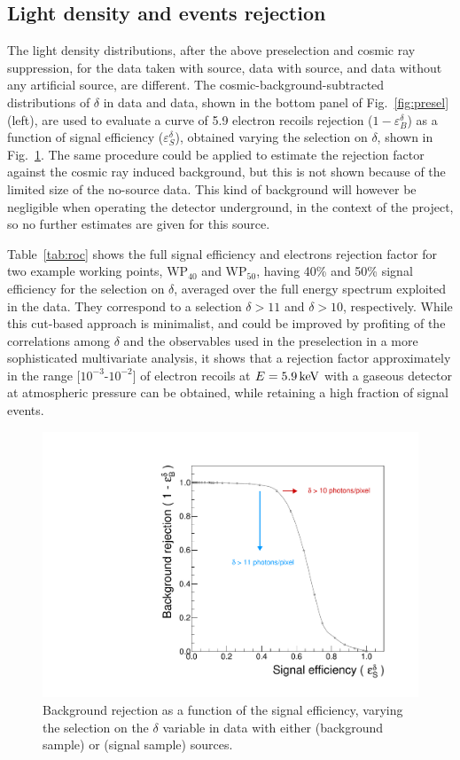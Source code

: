 \subsection{Light density and  \fe events rejection}
The light density distributions, after the above preselection and
cosmic ray suppression, for the data taken with \ambe source, data
with \fe source, and data without any artificial source, are
different.  The cosmic-background-subtracted distributions of $\delta$
in \ambe data and \fe data, shown in the bottom panel of
Fig.~\ref{fig:presel} (left), are used to evaluate a curve of 5.9\keV
electron recoils rejection ($1-\varepsilon^\delta_{B}$) as a function
of signal efficiency ($\varepsilon^\delta_{S}$), obtained varying the
selection on $\delta$, shown in Fig.~\ref{fig:roc}.  The same
procedure could be applied to estimate the rejection factor against
the cosmic ray induced background, but this is not shown because of
the limited size of the no-source data. This kind of background will
however be negligible when operating the detector underground, in the
context of the \cygno project, so no further estimates are given for
this source.

Table~\ref{tab:roc} shows the full signal efficiency and electrons
rejection factor for two example working points, $\mathrm{WP}_{40}$
and $\mathrm{WP}_{50}$, having 40\% and 50\% signal efficiency for the
selection on $\delta$, averaged over the full energy spectrum
exploited in the \ambe data. They correspond to a selection
$\delta>11$ and $\delta>10$, respectively.  While this cut-based
approach is minimalist, and could be improved by profiting of the
correlations among $\delta$ and the observables used in the
preselection in a more sophisticated multivariate analysis, it shows
that a rejection factor approximately in the range
[$10^{-3}$-$10^{-2}$] of electron recoils at $E=5.9\,\textrm{ke\hspace{-.08em}V}$ with a
gaseous detector at atmospheric pressure can be obtained, while
retaining a high fraction of signal events.
%
\begin{figure}[ht]
  \begin{center}
  \includegraphics[width=0.45\linewidth]{figures/density_roc}

  \caption{Background rejection as a function of the signal
    efficiency, varying the selection on the $\delta$ variable in data
    with either \fe (background sample) or \ambe (signal sample)
    sources.  \label{fig:roc}}

  \end{center}
\end{figure}
%




